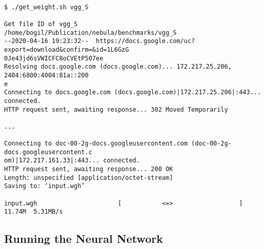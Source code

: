 \documentclass[10pt]{article}
\begin{document}
\begin{Verbatim}[frame=single,fontsize=\small]

$ ./get_weight.sh vgg_S

Get file ID of vgg_S
/home/bogil/Publication/nebula/benchmarks/vgg_S
--2020-04-16 19:23:32--  https://docs.google.com/uc?export=download&confirm=&id=1L6GzG
0Je43jd6sVWICFC8oCVEtP507ee
Resolving docs.google.com (docs.google.com)... 172.217.25.206, 2404:6800:4004:81a::200
e
Connecting to docs.google.com (docs.google.com)|172.217.25.206|:443... connected.
HTTP request sent, awaiting response... 302 Moved Temporarily

...

Connecting to doc-00-2g-docs.googleusercontent.com (doc-00-2g-docs.googleusercontent.c
om)|172.217.161.33|:443... connected.
HTTP request sent, awaiting response... 200 OK
Length: unspecified [application/octet-stream]
Saving to: ‘input.wgh’

input.wgh                      [           <=>                  ]  11.74M  5.31MB/s

\end{Verbatim}

\subsection{Running the Neural Network} \label{subsec:running_network}
\end{document}
